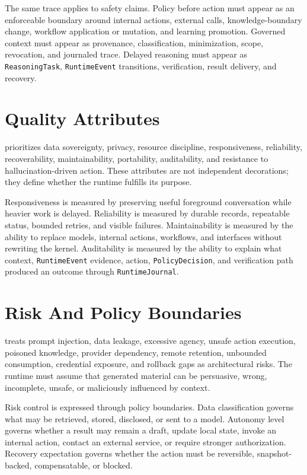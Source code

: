\documentclass[11pt]{report}
\begin{document}
The same trace applies to safety claims. Policy before action must appear as an enforceable boundary around internal actions, external calls, knowledge-boundary change, workflow application or mutation, and learning promotion. Governed context must appear as provenance, classification, minimization, scope, revocation, and journaled trace. Delayed reasoning must appear as \texttt{ReasoningTask}, \texttt{RuntimeEvent} transitions, verification, result delivery, and recovery.

\section{Quality Attributes}

\Madre prioritizes data sovereignty, privacy, resource discipline, responsiveness, reliability, recoverability, maintainability, portability, auditability, and resistance to hallucination-driven action. These attributes are not independent decorations; they define whether the runtime fulfills its purpose.

Responsiveness is measured by preserving useful foreground conversation while heavier work is delayed. Reliability is measured by durable records, repeatable status, bounded retries, and visible failures. Maintainability is measured by the ability to replace models, internal actions, workflows, and interfaces without rewriting the kernel. Auditability is measured by the ability to explain what context, \texttt{RuntimeEvent} evidence, action, \texttt{PolicyDecision}, and verification path produced an outcome through \texttt{RuntimeJournal}.

\section{Risk And Policy Boundaries}

\Madre treats prompt injection, data leakage, excessive agency, unsafe action execution, poisoned knowledge, provider dependency, remote retention, unbounded consumption, credential exposure, and rollback gaps as architectural risks. The runtime must assume that generated material can be persuasive, wrong, incomplete, unsafe, or maliciously influenced by context.

Risk control is expressed through policy boundaries. Data classification governs what may be retrieved, stored, disclosed, or sent to a model. Autonomy level governs whether a result may remain a draft, update local state, invoke an internal action, contact an external service, or require stronger authorization. Recovery expectation governs whether the action must be reversible, snapshot-backed, compensatable,
or blocked.
\end{document}
